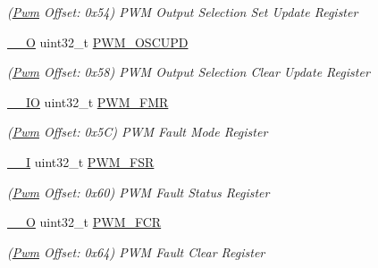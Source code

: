 \begin{DoxyCompactItemize}
\begin{DoxyCompactList}\small\item\em (\mbox{\hyperlink{structPwm}{Pwm}} Offset\+: 0x54) P\+WM Output Selection Set Update Register \end{DoxyCompactList}\item 
\mbox{\label{structPwm_a43a2bcdf60ea492aa45213f1e86df095}} 
\mbox{\hyperlink{core__cm7_8h_a7e25d9380f9ef903923964322e71f2f6}{\+\_\+\+\_\+O}} uint32\+\_\+t \mbox{\hyperlink{structPwm_a43a2bcdf60ea492aa45213f1e86df095}{P\+W\+M\+\_\+\+O\+S\+C\+U\+PD}}
\begin{DoxyCompactList}\small\item\em (\mbox{\hyperlink{structPwm}{Pwm}} Offset\+: 0x58) P\+WM Output Selection Clear Update Register \end{DoxyCompactList}\item 
\mbox{\label{structPwm_a00025ddbc45edc6db0c57987237d2851}} 
\mbox{\hyperlink{core__cm7_8h_aec43007d9998a0a0e01faede4133d6be}{\+\_\+\+\_\+\+IO}} uint32\+\_\+t \mbox{\hyperlink{structPwm_a00025ddbc45edc6db0c57987237d2851}{P\+W\+M\+\_\+\+F\+MR}}
\begin{DoxyCompactList}\small\item\em (\mbox{\hyperlink{structPwm}{Pwm}} Offset\+: 0x5C) P\+WM Fault Mode Register \end{DoxyCompactList}\item 
\mbox{\label{structPwm_a4f928b7c529e928cd4ff9607f79cd5fd}} 
\mbox{\hyperlink{core__cm7_8h_af63697ed9952cc71e1225efe205f6cd3}{\+\_\+\+\_\+I}} uint32\+\_\+t \mbox{\hyperlink{structPwm_a4f928b7c529e928cd4ff9607f79cd5fd}{P\+W\+M\+\_\+\+F\+SR}}
\begin{DoxyCompactList}\small\item\em (\mbox{\hyperlink{structPwm}{Pwm}} Offset\+: 0x60) P\+WM Fault Status Register \end{DoxyCompactList}\item 
\mbox{\label{structPwm_acbca535e1afb2eea771be902a805d603}} 
\mbox{\hyperlink{core__cm7_8h_a7e25d9380f9ef903923964322e71f2f6}{\+\_\+\+\_\+O}} uint32\+\_\+t \mbox{\hyperlink{structPwm_acbca535e1afb2eea771be902a805d603}{P\+W\+M\+\_\+\+F\+CR}}
\begin{DoxyCompactList}\small\item\em (\mbox{\hyperlink{structPwm}{Pwm}} Offset\+: 0x64) P\+WM Fault Clear Register \end{DoxyCompactList}\item 

\end{DoxyCompactItemize}
